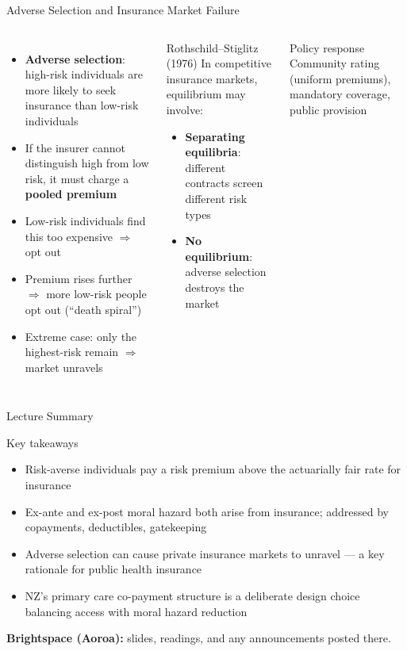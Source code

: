 \documentclass[aspectratio=169, 12pt]{beamer}
\newcommand{\summaryside}[1]{%
  \begin{frame}{Lecture Summary}
    \begin{exampleblock}{Key takeaways}
      \begin{itemize}#1\end{itemize}
    \end{exampleblock}
    \vspace{0.5em}
    {\footnotesize\textcolor{OtagoGold}{\textbf{Brightspace (Aoroa):}} slides, readings, and any announcements posted there.}
  \end{frame}}
\begin{document}
\begin{frame}{Adverse Selection and Insurance Market Failure}
  \begin{columns}
      \begin{itemize}
        \item \textbf{Adverse selection}: high-risk individuals are more likely to seek insurance
              than low-risk individuals
        \item If the insurer cannot distinguish high from low risk, it must charge a
              \textbf{pooled premium}
        \item Low-risk individuals find this too expensive $\Rightarrow$ opt out
        \item Premium rises further $\Rightarrow$ more low-risk people opt out (``death spiral'')
        \item Extreme case: only the highest-risk remain $\Rightarrow$ market unravels
      \end{itemize}
      \begin{alertblock}{Rothschild--Stiglitz (1976)}
        In competitive insurance markets, equilibrium may involve:
        \begin{itemize}
          \item \textbf{Separating equilibria}: different contracts screen different risk types
          \item \textbf{No equilibrium}: adverse selection destroys the market
        \end{itemize}
      \end{alertblock}
      \vspace{0.3em}
      \begin{block}{Policy response}
        Community rating (uniform premiums), mandatory coverage, public provision
      \end{block}
  \end{columns}
\end{frame}

\summaryside{
  \item Risk-averse individuals pay a risk premium above the actuarially fair rate for insurance
  \item Ex-ante and ex-post moral hazard both arise from insurance; addressed by copayments, deductibles, gatekeeping
  \item Adverse selection can cause private insurance markets to unravel --- a key rationale for public health insurance
  \item NZ's primary care co-payment structure is a deliberate design choice balancing access with moral hazard reduction
}
\end{document}
